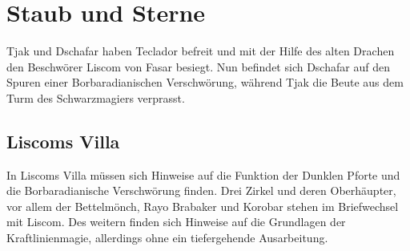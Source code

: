 \section{Staub und Sterne}

Tjak und Dschafar haben Teclador befreit und mit der Hilfe des alten Drachen den Beschwörer Liscom von Fasar besiegt. Nun befindet sich Dschafar auf den Spuren einer Borbaradianischen Verschwörung, während Tjak die Beute aus dem Turm des Schwarzmagiers verprasst.

\subsection{Liscoms Villa}

In Liscoms Villa müssen sich Hinweise auf die Funktion der Dunklen Pforte und die Borbaradianische Verschwörung finden. Drei Zirkel und deren Oberhäupter, vor allem der Bettelmönch, Rayo Brabaker und Korobar stehen im Briefwechsel mit Liscom. Des weitern finden sich Hinweise auf die Grundlagen der Kraftlinienmagie, allerdings ohne ein tiefergehende Ausarbeitung.
